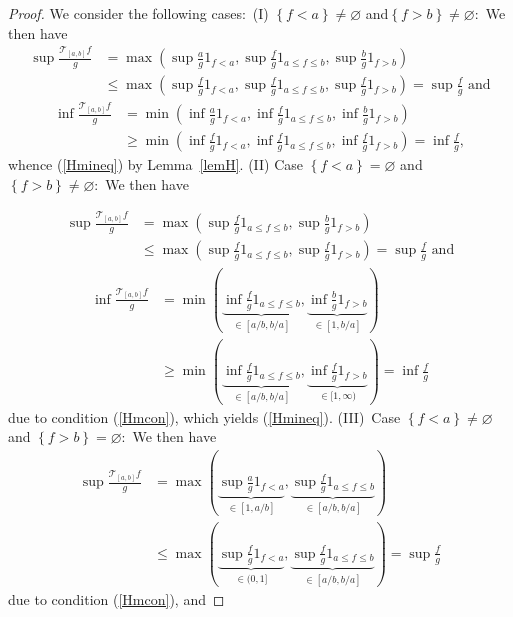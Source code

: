 \documentclass[a4paper,11pt]{amsart}
\theoremstyle{plain}
\theoremstyle{remark}
\begin{document}
\begin{proof}
We consider the following cases:\ (I) $\left\{  f<a\right\}  \neq\varnothing$
and$\left\{  f>b\right\}  \neq\varnothing:$ We then have%
\begin{align*}
\sup\frac{\mathcal{T}_{\left[  a,b\right]  }f}{g} &  =\max\left(  \sup\frac
{a}{g}1_{f<a},\sup\frac{f}{g}1_{a\leq f\leq b},\sup\frac{b}{g}1_{f>b}\right)
\\
&  \leq\max\left(  \sup\frac{f}{g}1_{f<a},\sup\frac{f}{g}1_{a\leq f\leq
b},\sup\frac{f}{g}1_{f>b}\right)  =\sup\frac{f}{g}\text{ \ \ and}%
\end{align*}%
\begin{align*}
\inf\frac{\mathcal{T}_{\left[  a,b\right]  }f}{g} &  =\min\left(  \inf\frac
{a}{g}1_{f<a},\inf\frac{f}{g}1_{a\leq f\leq b},\inf\frac{b}{g}1_{f>b}\right)
\\
&  \geq\min\left(  \inf\frac{f}{g}1_{f<a},\inf\frac{f}{g}1_{a\leq f\leq
b},\inf\frac{f}{g}1_{f>b}\right)  =\inf\frac{f}{g},
\end{align*}
whence (\ref{Hmineq}) by Lemma~\ref{lemH}. (II) Case $\left\{  f<a\right\}  =\varnothing$ and
$\left\{  f>b\right\}  \neq\varnothing:$ We then have%

\begin{align*}
\sup\frac{\mathcal{T}_{\left[  a,b\right]  }f}{g} &  =\max\left(  \sup\frac
{f}{g}1_{a\leq f\leq b},\sup\frac{b}{g}1_{f>b}\right)  \\
&  \leq\max\left(  \sup\frac{f}{g}1_{a\leq f\leq b},\sup\frac{f}{g}%
1_{f>b}\right)  =\sup\frac{f}{g}\text{ \ \ and}%
\end{align*}
\begin{align*}
\inf\frac{\mathcal{T}_{\left[  a,b\right]  }f}{g} &  =\min\left(
\underset{\in\left[  a/b,b/a\right]  }{\underbrace{\inf\frac{f}{g}1_{a\leq
f\leq b}}},\underset{\in\left[  1,b/a\right]  }{\underbrace{\inf\frac{b}%
{g}1_{f>b}}}\right)  \\
&  \geq\min\left(  \underset{\in\left[  a/b,b/a\right]  }{\underbrace{\inf
\frac{f}{g}1_{a\leq f\leq b}}},\underset{\in\lbrack1,\infty)}{\underbrace{\inf
\frac{f}{g}1_{f>b}}}\right)  =\inf\frac{f}{g}%
\end{align*}
due to condition (\ref{Hmcon}), which yields (\ref{Hmineq}). (III)\ Case
$\left\{  f<a\right\}  \neq\varnothing$ and $\left\{  f>b\right\}
=\varnothing:$ We then have%
\begin{align*}
\sup\frac{\mathcal{T}_{\left[  a,b\right]  }f}{g} &  =\max\left(
\underset{\in\left[  1,a/b\right]  }{\underbrace{\sup\frac{a}{g}1_{f<a}}%
},\underset{\in\left[  a/b,b/a\right]  }{\underbrace{\sup\frac{f}{g}1_{a\leq
f\leq b}}}\right)  \\
&  \leq\max\left(  \underset{\in(0,1]}{\underbrace{\sup\frac{f}{g}1_{f<a}}%
},\underset{\in\left[  a/b,b/a\right]  }{\underbrace{\sup\frac{f}{g}1_{a\leq
f\leq b}}}\right)  =\sup\frac{f}{g}%
\end{align*}
due to condition (\ref{Hmcon}), and%


\end{proof}
\end{document}
